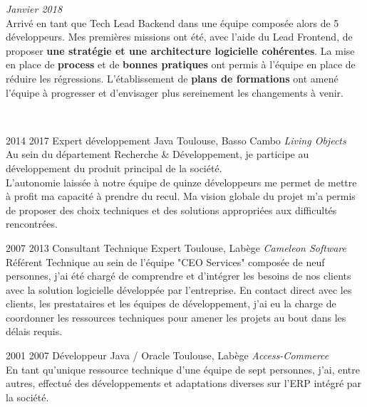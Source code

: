 \documentclass{friggeri-cv} 	%
\begin{document}
\begin{entrylist}
{\begin{description}[leftmargin=0cm]
    \item[\hspace*{-1cm}\bodyfont{|} \normalfont \textbf{\color{orange}Tech \color{headercolor}Lead Backend}] \hfill \textit{Janvier 2018} \\
    Arrivé en tant que Tech Lead Backend dans une équipe composée alors de 5 développeurs. Mes premières missions ont été, avec l’aide du Lead Frontend, de proposer \textbf{une stratégie et une architecture logicielle cohérentes}. La mise en place de \textbf{process} et de \textbf{bonnes pratiques} ont permis à l’équipe en place de réduire les régressions. L’établissement de \textbf{plans de formations} ont amené l’équipe à progresser et d’envisager plus sereinement les changements à venir.
\end{description}
\
}

\entry
{2014  2017}
{Expert développement Java}
{Toulouse, Basso Cambo}
{\vspace{0.2cm}\emph{Living Objects} \\
Au sein du département Recherche \& Développement, je participe au développement du produit principal de la société.\\
L’autonomie laissée à notre équipe de quinze développeurs me permet de mettre à profit ma capacité à prendre du recul. Ma vision globale du projet m’a permis de proposer des choix techniques et des solutions appropriées aux difficultés rencontrées.
\\}
\end{entrylist}
\begin{entrylist}
\entry
{2007  2013}
{Consultant Technique Expert}
{Toulouse, Labège}
{\vspace{0.2cm}\emph{Cameleon Software} \\
Référent Technique au sein de l’équipe "CEO Services" composée de neuf personnes, j’ai été chargé de comprendre et d’intégrer les besoins de nos clients avec la solution logicielle développée par l’entreprise. En contact direct avec les clients, les prestataires et les équipes de développement, j’ai eu la charge de coordonner les ressources techniques pour amener les projets au bout dans les délais requis.
\
}

\entry
{2001 \ding{224} 2007}
{Développeur Java / Oracle}
{Toulouse, Labège}
{\vspace{0.2cm}\emph{Access-Commerce}  \\
En tant qu’unique ressource technique d'une équipe de sept personnes, j’ai, entre autres, effectué des développements et adaptations diverses sur l’ERP intégré par la société.
}
\end{entrylist}
\end{document}
